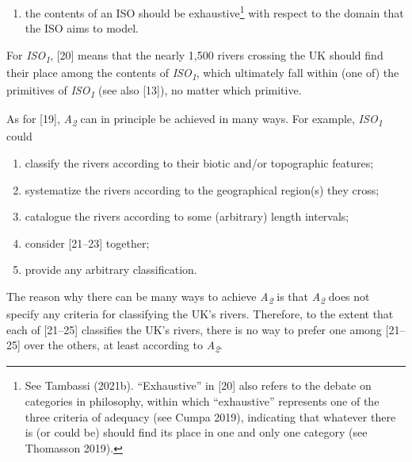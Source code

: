 \setcounter{saveenum}{\value{enumi}}

\begin{enumerate}

\setcounter{enumi}{\value{saveenum}}

\item the contents of an ISO should be exhaustive\footnote{\textrm{ See Tambassi (2021b). ``Exhaustive'' in [20] also refers to the debate on categories in philosophy, within which ``exhaustive'' represents one of the three criteria of adequacy (see Cumpa 2019), indicating that whatever there is (or could be) should find its place in one and only one category (see Thomasson 2019). }} with respect to the domain that the ISO aims to model.

\end{enumerate}

For \textit{ISO}\textit{\textsubscript{1}}, [20] means that the nearly 1,500 rivers crossing the UK should find their place among the contents of \textit{ISO}\textit{\textsubscript{1}}, which ultimately fall within (one of) the primitives of \textit{ISO}\textit{\textsubscript{1}} (see also [13]), no matter which primitive.



As for [19], \textit{A}\textit{\textsubscript{2}} can in principle be achieved in many ways. For example, \textit{ISO}\textit{\textsubscript{1}} could



\setcounter{saveenum}{\value{enumi}}

\begin{enumerate}

\setcounter{enumi}{\value{saveenum}}

\item classify the rivers according to their biotic and/or topographic features;

\item systematize the rivers according to the geographical region(s) they cross;

\item catalogue the rivers according to some (arbitrary) length intervals;

\item consider [21–23] together;

\item provide any arbitrary classification.

\end{enumerate}

The reason why there can be many ways to achieve \textit{A}\textit{\textsubscript{2}} is that \textit{A}\textit{\textsubscript{2}} does not specify any criteria for classifying the UK's rivers. Therefore, to the extent that each of [21–25] classifies the UK's rivers, there is no way to prefer one among [21–25] over the others, at least according to \textit{A}\textit{\textsubscript{2}}.



